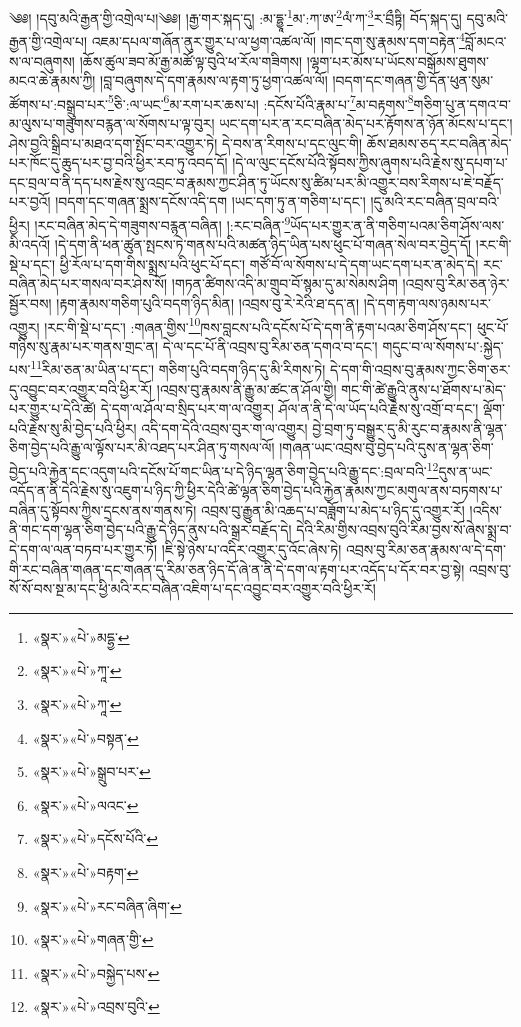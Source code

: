༄༅། །དབུ་མའི་རྒྱན་གྱི་འགྲེལ་པ།༄༅། །རྒྱ་གར་སྐད་དུ། :མ་དྷྱཱ་\footnote{«སྣར་»«པེ་»མདྷྱ་}མ་:ཀ་ཨ་\footnote{«སྣར་»«པེ་»ཀཱ་}ལཾ་ཀ་\footnote{«སྣར་»«པེ་»ཀཱ་}ར་བྲྀཏྟི། བོད་སྐད་དུ། དབུ་མའི་རྒྱན་གྱི་འགྲེལ་པ། འཇམ་དཔལ་གཞོན་ནུར་གྱུར་པ་ལ་ཕྱག་འཚལ་ལོ། །གང་དག་སུ་རྣམས་དག་བརྟེན་\footnote{«སྣར་»«པེ་»བསྟན་}བློ་མངའ་ས་ལ་བཞུགས། །ཆོས་ཚུལ་ཟབ་མོ་རྒྱ་མཚོ་ལྟ་བུའི་ཕ་རོལ་གཟིགས། །ལྷག་པར་མོས་པ་ཡོངས་བསྒོམས་ཐུགས་མངའ་ཆེ་རྣམས་ཀྱི། །བླ་བཞུགས་དེ་དག་རྣམས་ལ་རྟག་ཏུ་ཕྱག་འཚལ་ལོ། །བདག་དང་གཞན་གྱི་དོན་ཕུན་སུམ་ཚོགས་པ་:བསྒྲུབ་པར་\footnote{«སྣར་»«པེ་»སྒྲུབ་པར་}ཅི་:ལ་ཡང་\footnote{«སྣར་»«པེ་»ལའང་}མ་རག་པར་ཆས་པ། :དངོས་པོའི་རྣམ་པ་\footnote{«སྣར་»«པེ་»དངོས་པོའི་}མ་བརྟགས་\footnote{«སྣར་»«པེ་»བརྟག་}གཅིག་པུ་ན་དགའ་བ་མ་ལུས་པ་གཟུགས་བརྙན་ལ་སོགས་པ་ལྟ་བུར། ཡང་དག་པར་ན་རང་བཞིན་མེད་པར་རྟོགས་ན་ཉོན་མོངས་པ་དང་། ཤེས་བྱའི་སྒྲིབ་པ་མཐའ་དག་སྤོང་བར་འགྱུར་ཏེ། དེ་བས་ན་རིགས་པ་དང་ལུང་གི། ཆོས་ཐམས་ཅད་རང་བཞིན་མེད་པར་ཁོང་དུ་ཆུད་པར་བྱ་བའི་ཕྱིར་རབ་ཏུ་འབད་དོ། །དེ་ལ་ལུང་དངོས་པོའི་སྟོབས་ཀྱིས་ཞུགས་པའི་རྗེས་སུ་དཔག་པ་དང་བྲལ་བ་ནི་དད་པས་རྗེས་སུ་འབྲང་བ་རྣམས་ཀྱང་ཤིན་ཏུ་ཡོངས་སུ་ཚིམ་པར་མི་འགྱུར་བས་རིགས་པ་ཇེ་བརྗོད་པར་བྱའོ། །བདག་དང་གཞན་སྨྲས་དངོས་འདི་དག །ཡང་དག་ཏུ་ན་གཅིག་པ་དང་། །དུ་མའི་རང་བཞིན་བྲལ་བའི་ཕྱིར། །རང་བཞིན་མེད་དེ་གཟུགས་བརྙན་བཞིན། །:རང་བཞིན་\footnote{«སྣར་»«པེ་»རང་བཞིན་ཞིག་}ཡོད་པར་གྱུར་ན་ནི་གཅིག་པའམ་ཅིག་ཤོས་ལས་མི་འདའོ། །དེ་དག་ནི་ཕན་ཚུན་སྤངས་ཏེ་གནས་པའི་མཚན་ཉིད་ཡིན་པས་ཕུང་པོ་གཞན་སེལ་བར་བྱེད་དོ། །རང་གི་སྡེ་པ་དང་། ཕྱི་རོལ་པ་དག་གིས་སྨྲས་པའི་ཕུང་པོ་དང་། གཙོ་བོ་ལ་སོགས་པ་དེ་དག་ཡང་དག་པར་ན་མེད་དེ། རང་བཞིན་མེད་པར་གསལ་བར་ཤེས་སོ། །གཏན་ཚིགས་འདི་མ་གྲུབ་བོ་སྙམ་དུ་མ་སེམས་ཤིག །འབྲས་བུ་རིམ་ཅན་ཉེར་སྦྱོར་བས། །རྟག་རྣམས་གཅིག་པུའི་བདག་ཉིད་མིན། །འབྲས་བུ་རེ་རེའི་ཐ་དད་ན། །དེ་དག་རྟག་ལས་ཉམས་པར་འགྱུར། །རང་གི་སྡེ་པ་དང་། :གཞན་གྱིས་\footnote{«སྣར་»«པེ་»གཞན་གྱི་}ཁས་བླངས་པའི་དངོས་པོ་དེ་དག་ནི་རྟག་པའམ་ཅིག་ཤོས་དང་། ཕུང་པོ་གཉིས་སུ་རྣམ་པར་གནས་གྲང་ན། དེ་ལ་དང་པོ་ནི་འབྲས་བུ་རིམ་ཅན་དགའ་བ་དང་། གདུང་བ་ལ་སོགས་པ་:སྐྱེད་པས་\footnote{«སྣར་»«པེ་»བསྐྱེད་པས་}རིམ་ཅན་མ་ཡིན་པ་དང་། གཅིག་པུའི་བདག་ཉིད་དུ་མི་རིགས་ཏེ། དེ་དག་གི་འབྲས་བུ་རྣམས་ཀྱང་ཅིག་ཅར་དུ་འབྱུང་བར་འགྱུར་བའི་ཕྱིར་རོ། །འབྲས་བུ་རྣམས་ནི་རྒྱུ་མ་ཚང་ན་ཤོལ་གྱི། གང་གི་ཚེ་རྒྱུའི་ནུས་པ་ཐོགས་པ་མེད་པར་གྱུར་པ་དེའི་ཚེ། དེ་དག་ལ་ཤོལ་བ་སྲིད་པར་ག་ལ་འགྱུར། ཤོལ་ན་ནི་དེ་ལ་ཡོད་པའི་རྗེས་སུ་འགྲོ་བ་དང་། ལྡོག་པའི་རྗེས་སུ་མི་བྱེད་པའི་ཕྱིར། འདི་དག་དེའི་འབྲས་བུར་ག་ལ་འགྱུར། བྱེ་བྲག་ཏུ་བསྒྱུར་དུ་མི་རུང་བ་རྣམས་ནི་ལྷན་ཅིག་བྱེད་པའི་རྒྱུ་ལ་ལྟོས་པར་མི་འཐད་པར་ཤིན་ཏུ་གསལ་ལོ། །གཞན་ཡང་འབྲས་བུ་བྱེད་པའི་དུས་ན་ལྷན་ཅིག་བྱེད་པའི་རྐྱེན་དང་འདུག་པའི་དངོས་པོ་གང་ཡིན་པ་དེ་ཉིད་ལྷན་ཅིག་བྱེད་པའི་རྒྱུ་དང་:བྲལ་བའི་\footnote{«སྣར་»«པེ་»འབྲས་བུའི་}དུས་ན་ཡང་འདོད་ན་ནི་དེའི་རྗེས་སུ་འཇུག་པ་ཉིད་ཀྱི་ཕྱིར་དེའི་ཚེ་ལྷན་ཅིག་བྱེད་པའི་རྐྱེན་རྣམས་ཀྱང་མགུལ་ནས་བཏགས་པ་བཞིན་དུ་སྟོབས་ཀྱིས་དྲངས་ནས་གནས་ཏེ། འབྲས་བུ་རྒྱུན་མི་འཆད་པ་བཟློག་པ་མེད་པ་ཉིད་དུ་འགྱུར་རོ། །འདིས་ནི་གང་དག་ལྷན་ཅིག་བྱེད་པའི་རྒྱུ་དེ་ཉིད་ནུས་པའི་སྒྲར་བརྗོད་དེ། དེའི་རིམ་གྱིས་འབྲས་བུའི་རིམ་བྱས་སོ་ཞེས་སྨྲ་བ་དེ་དག་ལ་ལན་བཏབ་པར་གྱུར་ཏོ། །ཇི་སྟེ་ཉེས་པ་འདིར་འགྱུར་དུ་འོང་ཞེས་ཏེ། འབྲས་བུ་རིམ་ཅན་རྣམས་ལ་དེ་དག་གི་རང་བཞིན་གཞན་དང་གཞན་དུ་རིམ་ཅན་ཉིད་དོ་ཞེ་ན་ནི་དེ་དག་ལ་རྟག་པར་འདོད་པ་དོར་བར་བྱ་སྟེ། འབྲས་བུ་སོ་སོ་བས་སྔ་མ་དང་ཕྱི་མའི་རང་བཞིན་འཇིག་པ་དང་འབྱུང་བར་འགྱུར་བའི་ཕྱིར་རོ། 